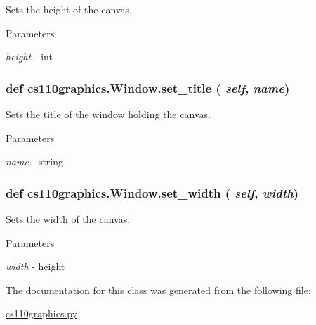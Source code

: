 Sets the height of the canvas. 
\begin{DoxyParams}{Parameters}
\item[{\em height}]-\/ int \end{DoxyParams}
\hypertarget{classcs110graphics_1_1Window_a227c806c2acbcaca9958ba3b610a85f6}{
\subsubsection[{set\_\-title}]{\setlength{\rightskip}{0pt plus 5cm}def cs110graphics.Window.set\_\-title ( {\em self}, \/   {\em name})}}
\label{classcs110graphics_1_1Window_a227c806c2acbcaca9958ba3b610a85f6}


Sets the title of the window holding the canvas. 
\begin{DoxyParams}{Parameters}
\item[{\em name}]-\/ string \end{DoxyParams}
\hypertarget{classcs110graphics_1_1Window_a55036373bfb4437eb4368a39fedb8722}{
\subsubsection[{set\_\-width}]{\setlength{\rightskip}{0pt plus 5cm}def cs110graphics.Window.set\_\-width ( {\em self}, \/   {\em width})}}
\label{classcs110graphics_1_1Window_a55036373bfb4437eb4368a39fedb8722}


Sets the width of the canvas. 
\begin{DoxyParams}{Parameters}
\item[{\em width}]-\/ height \end{DoxyParams}


The documentation for this class was generated from the following file:\begin{DoxyCompactItemize}
\item 
\hyperlink{cs110graphics_8py}{cs110graphics.py}\end{DoxyCompactItemize}
